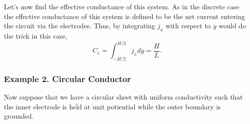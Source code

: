 \documentclass[]{article}
\begin{document}
Let's now find the effective conductance of this system. As in the
discrete case the effective conductance of this system is defined to be
the net current entering the circuit via the electrodes. Thus, by
integrating \(j_x\) with respect to \(y\) would do the trick in this
case, \[C_e = \int_{-H/2}^{H/2} j_x dy = \frac{H}{L}.\]

\subsubsection{Example 2. Circular
Conductor}\label{example-2.-circular-conductor}

Now suppose that we have a circular sheet with uniform conductivity such
that the inner electrode is held at unit potiential while the outer
boundary is grounded.

\begin{figure}
\centering


\begin{tikzpicture}[x=0.75pt,y=0.75pt,yscale=-1,xscale=1]


\end{tikzpicture}
\end{figure}
\end{document}
